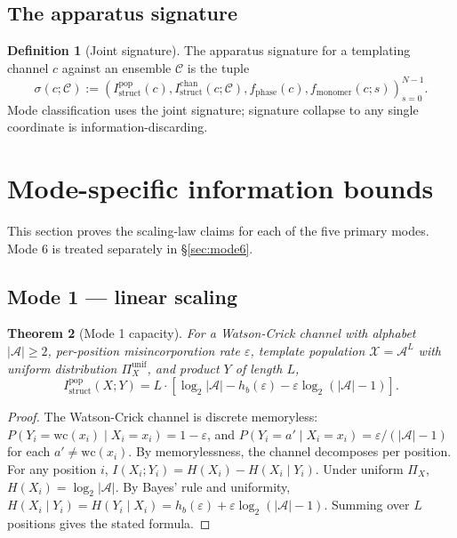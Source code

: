 \documentclass[11pt]{article}
\theoremstyle{plain}
\newtheorem{theorem}{Theorem}
\theoremstyle{definition}
\newtheorem{definition}[theorem]{Definition}
\newcommand{\Istructpop}{I_{\mathrm{struct}}^{\mathrm{pop}}}
\newcommand{\Istructchan}{I_{\mathrm{struct}}^{\mathrm{chan}}}
\newcommand{\fphase}{f_{\mathrm{phase}}}
\newcommand{\fmonomer}{f_{\mathrm{monomer}}}
\newcommand{\Hbin}{h_b}
\begin{document}
\subsection{The apparatus signature}

\begin{definition}[Joint signature]
The apparatus signature for a templating channel $c$ against an ensemble $\mathcal{C}$ is the tuple
\[
\sigma(c; \mathcal{C}) := \left(\Istructpop(c), \Istructchan(c; \mathcal{C}), \fphase(c), \fmonomer(c; s)\right)_{s = 0}^{N-1}.
\]
Mode classification uses the joint signature; signature collapse to any single coordinate is information-discarding.
\end{definition}


\section{Mode-specific information bounds}

This section proves the scaling-law claims for each of the five primary modes. Mode 6 is treated separately in \S\ref{sec:mode6}.

\subsection{Mode 1 --- linear scaling}

\begin{theorem}[Mode 1 capacity]
\label{thm:mode1}
For a Watson-Crick channel with alphabet $|\mathcal{A}| \ge 2$, per-position misincorporation rate $\varepsilon$, template population $\mathcal{X} = \mathcal{A}^L$ with uniform distribution $\Pi_X^{\mathrm{unif}}$, and product $Y$ of length $L$,
\[
\Istructpop(X; Y) = L \cdot \left[\log_2 |\mathcal{A}| - \Hbin(\varepsilon) - \varepsilon \log_2 (|\mathcal{A}| - 1)\right].
\]
\end{theorem}

\begin{proof}
The Watson-Crick channel is discrete memoryless: $P(Y_i = \mathrm{wc}(x_i) \mid X_i = x_i) = 1 - \varepsilon$, and $P(Y_i = a' \mid X_i = x_i) = \varepsilon / (|\mathcal{A}| - 1)$ for each $a' \neq \mathrm{wc}(x_i)$. By memorylessness, the channel decomposes per position. For any position $i$, $I(X_i; Y_i) = H(X_i) - H(X_i \mid Y_i)$. Under uniform $\Pi_X$, $H(X_i) = \log_2 |\mathcal{A}|$. By Bayes' rule and uniformity, $H(X_i \mid Y_i) = H(Y_i \mid X_i) = \Hbin(\varepsilon) + \varepsilon \log_2 (|\mathcal{A}| - 1)$. Summing over $L$ positions gives the stated formula.
\end{proof}
\end{document}
